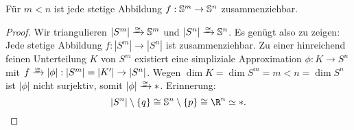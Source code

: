 \begin{st}
	Für $m < n$ ist jede stetige Abbildung $f: \S^m \to \S^n$ zusammenziehbar.
	\begin{proof}
		Wir triangulieren $|S^m| \homto \S^m$ und $|S^n| \homto \S^n$.
		Es genügt also zu zeigen: Jede stetige Abbildung $f: |S^m| \to |S^n|$ ist zusammenziehbar.
		Zu einer hinreichend feinen Unterteilung $K$ von $S^m$ existiert eine simpliziale Approximation $\phi: K \to S^n$ mit $f \homto |\phi|: |S^m| = |K'| \to |S^n|$.
		Wegen $\dim K = \dim S^m = m < n = \dim S^n$ ist $|\phi|$ nicht surjektiv, somit $|\phi| \homto *$.
		Erinnerung:
		\[
			|S^n| \setminus \{q\} \homeomorphic \S^n \setminus \{p\} \homeomorphic \R^n \homotopic *.
		\]
	\end{proof}
\end{st}
